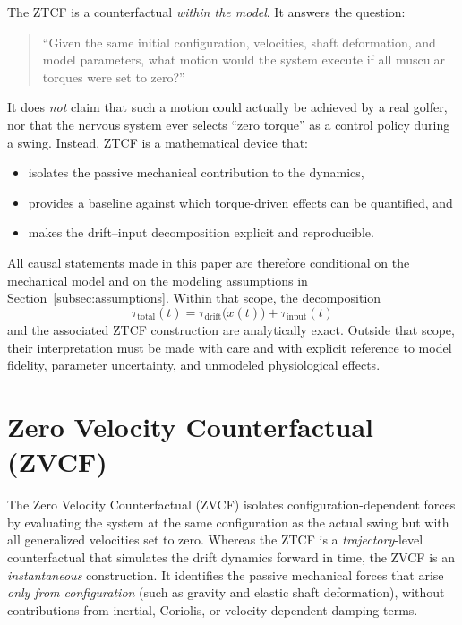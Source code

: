 \documentclass[12pt]{article}
\begin{document}
The ZTCF is a counterfactual \emph{within the model}. It answers the question:
\begin{quote}
  ``Given the same initial configuration, velocities, shaft deformation, and model parameters, what motion would the system execute if all muscular torques were set to zero?''
\end{quote}
It does \emph{not} claim that such a motion could actually be achieved by a real golfer, nor that the nervous system ever selects ``zero torque'' as a control policy during a swing. Instead, ZTCF is a mathematical device that:
\begin{itemize}
  \item isolates the passive mechanical contribution to the dynamics,
  \item provides a baseline against which torque-driven effects can be quantified, and
  \item makes the drift--input decomposition explicit and reproducible.
\end{itemize}

All causal statements made in this paper are therefore conditional on the mechanical model and on the modeling assumptions in Section~\ref{subsec:assumptions}. Within that scope, the decomposition
\[
  \tau_{\text{total}}(t) = \tau_{\text{drift}}\big(x(t)\big) + \tau_{\text{input}}(t)
\]
and the associated ZTCF construction are analytically exact. Outside that scope, their interpretation must be made with care and with explicit reference to model fidelity, parameter uncertainty, and unmodeled physiological effects.


\section{Zero Velocity Counterfactual (ZVCF)}
\label{sec:zvcf}


The Zero Velocity Counterfactual (ZVCF) isolates configuration-dependent forces by evaluating the system at the same configuration as the actual swing but with all generalized velocities set to zero. Whereas the ZTCF is a \emph{trajectory}-level counterfactual that simulates the drift dynamics forward in time, the ZVCF is an \emph{instantaneous} construction. It identifies the passive mechanical forces that arise \emph{only from configuration} (such as gravity and elastic shaft deformation), without contributions from inertial, Coriolis, or velocity-dependent damping terms.
\end{document}
